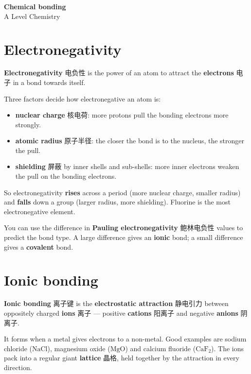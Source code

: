 \documentclass[11pt]{article}
\begin{document}
\begin{center}
  {\LARGE\bfseries Chemical bonding}\\[0.35em]
  {\large A Level Chemistry}
\end{center}
\vspace{0.6em}

\section*{Electronegativity}

\textbf{Electronegativity} 电负性 is the power of an atom to attract the \textbf{electrons} 电子 in a bond towards itself.

Three factors decide how electronegative an atom is:

\begin{itemize}
\item \textbf{nuclear charge} 核电荷: more protons pull the bonding electrons more strongly.

\item \textbf{atomic radius} 原子半径: the closer the bond is to the nucleus, the stronger the pull.

\item \textbf{shielding} 屏蔽 by inner shells and sub-shells: more inner electrons weaken the pull on the bonding electrons.

\end{itemize}

So electronegativity \textbf{rises} across a period (more nuclear charge, smaller radius) and \textbf{falls} down a group (larger radius, more shielding). Fluorine is the most electronegative element.

You can use the difference in \textbf{Pauling electronegativity} 鲍林电负性 values to predict the bond type. A large difference gives an \textbf{ionic} bond; a small difference gives a \textbf{covalent} bond.

\section*{Ionic bonding}

\textbf{Ionic bonding} 离子键 is the \textbf{electrostatic attraction} 静电引力 between oppositely charged \textbf{ions} 离子 — positive \textbf{cations} 阳离子 and negative \textbf{anions} 阴离子.

It forms when a metal gives electrons to a non-metal. Good examples are sodium chloride ($\text{NaCl}$), magnesium oxide ($\text{MgO}$) and calcium fluoride ($\text{CaF}_2$). The ions pack into a regular giant \textbf{lattice} 晶格, held together by the attraction in every direction.
\end{document}
